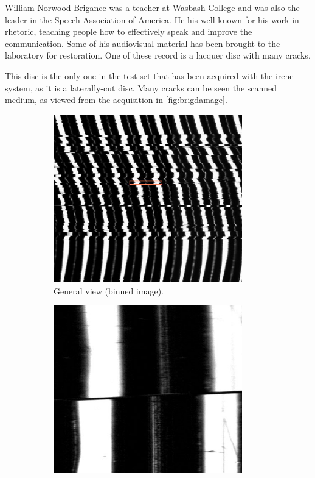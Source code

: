 William Norwood Brigance was a teacher at Wasbash College and was also the leader in the Speech Association of America. He his well-known for his work in rhetoric, teaching people how to effectively speak and improve the communication. Some of his audiovisual material has been brought to the laboratory for restoration. One of these record is a lacquer disc with many cracks.

This disc is the only one in the test set that has been acquired with the \gls{irene} system, as it is a laterally-cut disc. Many cracks can be seen the scanned medium, as viewed from the acquisition in \autoref{fig:brigdamage}.

\begin{figure}[!ht]
\centering
    \begin{subfigure}[t]{0.45\textwidth}
    \centering
    \includegraphics[width=0.9\textwidth]{images/brigance-cracks}
    \caption{General view (binned image).}
    \label{fig:brigcracks}
    \end{subfigure}
    \begin{subfigure}[t]{0.45\textwidth}
    \centering
    \includegraphics[width=0.9\textwidth]{images/brigance-crack-detail}

\end{subfigure}
\end{figure}
